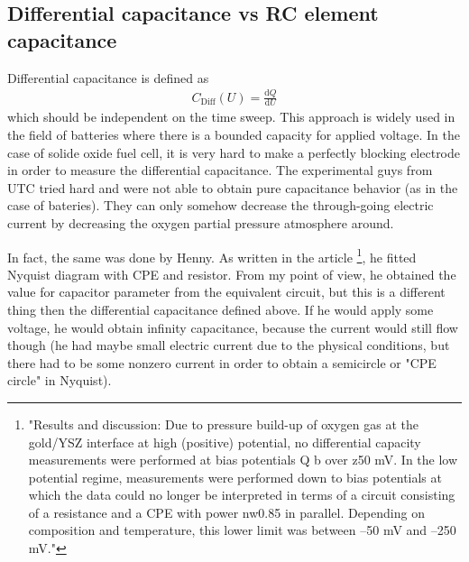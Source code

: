 \documentclass[a4 paper]{article}
\newcommand{\dd}{\mathrm{d}}
\begin{document}
\subsection{Differential capacitance vs RC element capacitance}
Differential capacitance is defined as 
\begin{align}
C_\text{Diff}(U) = \frac{\dd Q}{\dd U}
\end{align}
which should be independent on the time sweep. This approach is widely used in the field of batteries where there is a bounded capacity for applied voltage. In the case of solide oxide fuel cell, it is very hard to make a perfectly blocking electrode in order to measure the differential capacitance. The experimental guys from UTC tried hard and were not able to obtain pure capacitance behavior (as in the case of bateries). They can only somehow decrease the through-going electric current by decreasing the oxygen partial pressure atmosphere around. 

In fact, the same was done by Henny. As written in the article
\footnote{"Results and discussion: Due to pressure build-up of oxygen gas at the gold/YSZ interface at high (positive) potential, no differential capacity
measurements were performed at bias potentials Q b over z50 mV. In the low potential regime, measurements were performed down to bias potentials at which the data could no longer be interpreted in terms of a circuit consisting of a
resistance and a CPE with power nw0.85 in parallel. Depending on composition and temperature, this lower limit was between –50 mV and –250 mV."}, he fitted Nyquist diagram with CPE and resistor. From my point of view, he obtained the value for capacitor parameter from the equivalent circuit, but this is a different thing then the differential capacitance defined above. If he would apply some voltage, he would obtain infinity capacitance, because the current would still flow though (he had maybe small electric current due to the physical conditions, but there had to be some nonzero current in order to obtain a semicircle or "CPE circle" in Nyquist).
\end{document}
